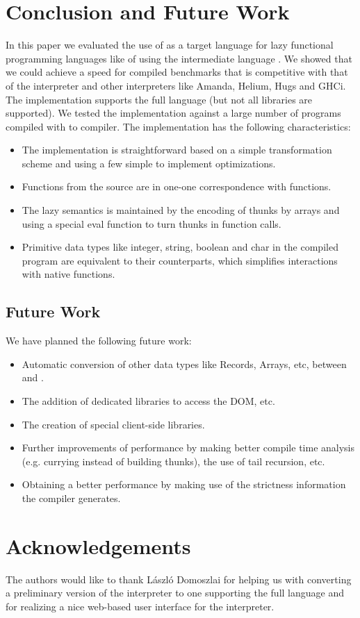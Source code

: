 \section{Conclusion and Future Work}\label{sapljs:sec:conclusions}
In this paper we evaluated the use of \JS as a target language for lazy functional programming languages like \Haskell of \Clean using the intermediate language \Sapl.
We showed that we could achieve a speed for compiled benchmarks 
that is competitive with that of the  \Sapl interpreter and other interpreters like \textsf{Amanda}, 
\textsf{Helium}, \textsf{Hugs} and \textsf{GHCi}.
The implementation supports the full \Clean language (but not all libraries are supported).
We tested the implementation against a large number of \Clean programs compiled with \Clean to \Sapl compiler. 
The implementation has the following characteristics:
\begin{itemize}
\item The implementation is straightforward based on a simple transformation scheme and using a few simple to implement optimizations.
\item Functions from the source are in one-one correspondence with \JS functions.
\item The lazy semantics is maintained by the encoding of thunks by \JS arrays and using a special \textsf{eval} function to turn thunks in function calls.
\item Primitive data types like integer, string, boolean and char in the compiled program are equivalent to their \JS counterparts, which simplifies interactions with native \JS functions.
\end{itemize}

\subsection{Future Work}
We have planned the following future work:
\begin{itemize}
\item Automatic conversion of other data types like Records, Arrays, etc, between \Sapl and \JS.
\item The addition of dedicated libraries to access the DOM, etc.
\item The creation of special client-side \iTask libraries.
\item Further improvements of performance by making better compile time analysis (e.g. \JS currying instead of building thunks),
the use of tail recursion, etc.
\item Obtaining a better performance by making use of the strictness information the \Clean compiler generates.
\end{itemize}

\section*{Acknowledgements}
The authors would like to thank L\'aszl\'o Domoszlai for helping us with converting a preliminary version of the interpreter to one supporting the full \Sapl language and
for realizing a nice web-based user interface for the interpreter.
